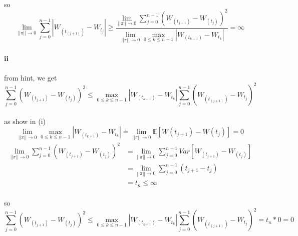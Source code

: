 \documentclass{article}
\begin{document}
\paragraph{}{so \begin{displaymath}
                    \lim_{||\pi|| \to 0}\sum_{j=0}^{n-1}|W_{(t_{(j+1)})}-W_{t_j}|\ge
\frac{\lim_{||\pi|| \to 0}\sum_{j=0}^{n-1}(W_{(t_{j+1})}-W_{(t_j)})^2}{\lim_{||\pi|| \to 0}\max_{0\le k\le n-1}|W_{(t_{k+1})}-W_{t_{k}}|}=\infty
                \end{displaymath}}
\paragraph{ii}{}
\paragraph{}{from hint, we get \begin{displaymath}
                             \sum_{j=0}^{n-1}(W_{(t_{j+1})}-W_{(t_j)})^3 \le \max_{0\le k\le n-1}|W_{(t_{k+1})}-W_{t_{k}}| \sum_{j=0}^{n-1}(W_{(t_{(j+1)})}-W_{t_j})^2
                           \end{displaymath}}
\paragraph{}{as show in (i) \begin{displaymath}
                              \lim_{||\pi|| \to 0}\max_{0\le k\le n-1}|W_{(t_{k+1})}-W_{t_{k}}|  \doteq \lim_{||\pi|| \to 0} \mathbb{E}[W(t_{j+1})-W(t_j)]=0
                            \end{displaymath}}
                            \begin{align*}
                                \lim_{||\pi|| \to 0}\sum_{j=0}^{n-1}(W_{(t_{j+1})}-W_{(t_j)})^2  & =\lim_{||\pi|| \to 0}\sum_{j=0}^{n-1}Var[W_{(t_{j+1})}-W_{(t_j)}]\\
                                &= \lim_{||\pi|| \to 0}\sum_{j=0}^{n-1}(t_{j+1}-t_{j})\\
                                & =t_{n}\le \infty
                              \end{align*}
\paragraph{}{so \begin{displaymath}
                             \sum_{j=0}^{n-1}(W_{(t_{j+1})}-W_{(t_j)})^3 \le \max_{0\le k\le n-1}|W_{(t_{k+1})}-W_{t_{k}}| \sum_{j=0}^{n-1}(W_{(t_{(j+1)})}-W_{t_j})^2=t_{n}*0=0
                           \end{displaymath}}
\end{document}
